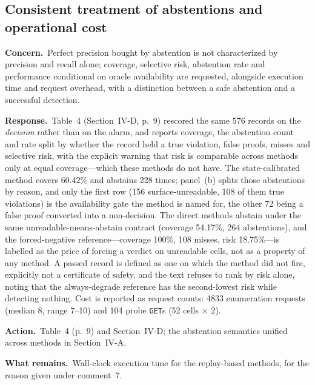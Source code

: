 \documentclass[10pt,letterpaper]{article}
\newcommand{\Concern}[1]{\par\smallskip\noindent\textbf{Concern.}\ #1\par}
\newcommand{\Response}[1]{\par\smallskip\noindent\textbf{Response.}\ #1\par}
\newcommand{\Action}[1]{\par\smallskip\noindent\textbf{Action.}\ #1\par}
\newcommand{\Remains}[1]{\par\smallskip\noindent\textbf{What remains.}\ #1\par}
\begin{document}
\subsection{Consistent treatment of abstentions and operational cost}
\Concern{Perfect precision bought by abstention is not characterized by precision
and recall alone; coverage, selective risk, abstention rate and performance
conditional on oracle availability are requested, alongside execution time and
request overhead, with a distinction between a safe abstention and a successful
detection.}
\Response{Table~4 (Section~IV-D, p.~9) rescored the same 576 records on the
\emph{decision} rather than on the alarm, and reports coverage, the abstention
count and rate split by whether the record held a true violation, false proofs,
misses and selective risk, with the explicit warning that risk is comparable
across methods only at equal coverage---which these methods do not have. The
state-calibrated method covers 60.42\% and abstains 228 times; panel~(b) splits
those abstentions by reason, and only the first row (156 surface-unreadable, 108
of them true violations) is the availability gate the method is named for, the
other 72 being a false proof converted into a non-decision. The direct methods
abstain under the same unreadable-means-abstain contract (coverage 54.17\%, 264
abstentions), and the forced-negative reference---coverage 100\%, 108 misses,
risk 18.75\%---is labelled as the price of forcing a verdict on unreadable cells,
not as a property of any method. A passed record is defined as one on which the
method did not fire, explicitly not a certificate of safety, and the text refuses
to rank by risk alone, noting that the always-degrade reference has the
second-lowest risk while detecting nothing. Cost is reported as request counts:
4833 enumeration requests (median 8, range 7--10) and 104 probe \texttt{GET}s
(52 cells $\times$ 2).}
\Action{Table~4 (p.~9) and Section~IV-D; the abstention semantics unified across
methods in Section~IV-A.}
\Remains{Wall-clock execution time for the replay-based methods, for the reason
given under comment~7.}
\end{document}
